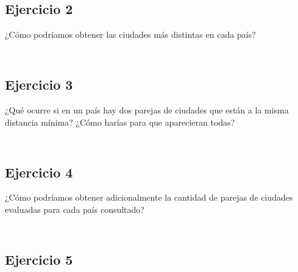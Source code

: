 \begin{lstlisting}

\end{lstlisting}

\subsection{Ejercicio 2}

¿Cómo podríamos obtener las ciudades más distintas en cada país?

\begin{lstlisting}

\end{lstlisting}

\begin{lstlisting}

\end{lstlisting}

\subsection{Ejercicio 3}

¿Qué ocurre si en un país hay dos parejas de ciudades que están a la misma distancia mínima? ¿Cómo harías para que aparecieran todas?

\begin{lstlisting}

\end{lstlisting}

\begin{lstlisting}

\end{lstlisting}

\subsection{Ejercicio 4}

¿Cómo podríamos obtener adicionalmente la cantidad de parejas de ciudades evaluadas para cada país consultado?

\begin{lstlisting}

\end{lstlisting}

\begin{lstlisting}

\end{lstlisting}

\subsection{Ejercicio 5}


